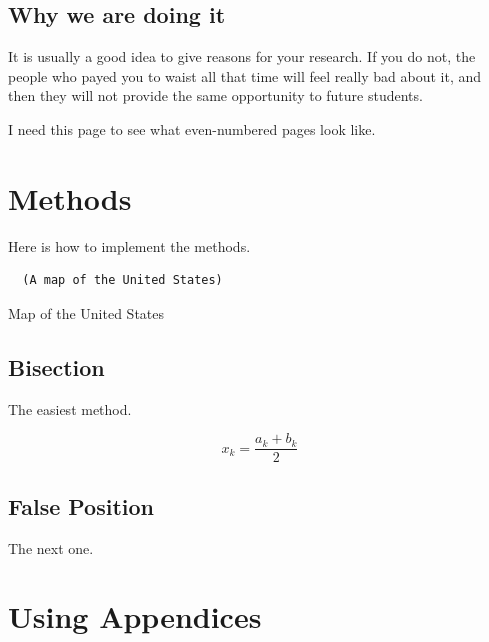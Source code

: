 \documentclass[thesis]{./tex/thesis-umich}
\begin{document}
\section{Why we are doing it}
It is usually a good idea to give reasons for your research.  If you do not, the people who payed you to waist all that time will feel really bad about it, and then they will not provide the same opportunity to future students.

\newpage

I need this page to see what even-numbered pages look like.

\appendix
\chapter{Methods}
Here is how to implement the methods.

\begin{program}
 \begin{verbatim}
  (A map of the United States)
 \end{verbatim}
 \caption{Map of the United States}
\end{program}

\section{Bisection}
The easiest method.

\begin{equation}
x_k = \frac{a_k+b_k}{2}
\end{equation}

\section{False Position}
The next one.


\chapter{Using Appendices}    \label{app:appendix}




\end{document}
